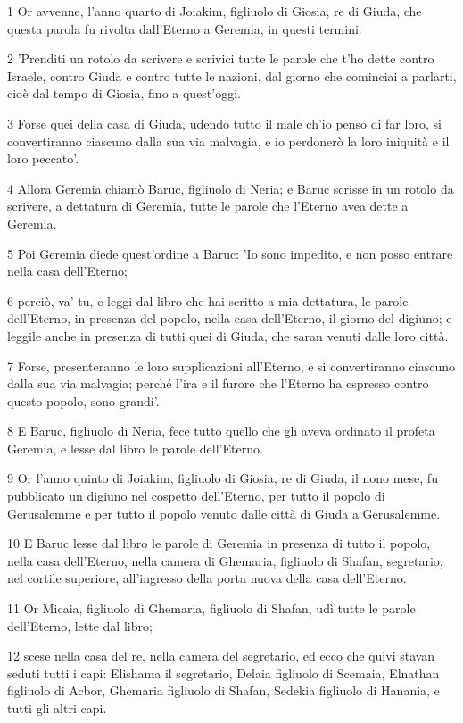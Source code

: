 \par 1 Or avvenne, l'anno quarto di Joiakim, figliuolo di Giosia, re di Giuda, che questa parola fu rivolta dall'Eterno a Geremia, in questi termini:
\par 2 'Prenditi un rotolo da scrivere e scrivici tutte le parole che t'ho dette contro Israele, contro Giuda e contro tutte le nazioni, dal giorno che cominciai a parlarti, cioè dal tempo di Giosia, fino a quest'oggi.
\par 3 Forse quei della casa di Giuda, udendo tutto il male ch'io penso di far loro, si convertiranno ciascuno dalla sua via malvagia, e io perdonerò la loro iniquità e il loro peccato'.
\par 4 Allora Geremia chiamò Baruc, figliuolo di Neria; e Baruc scrisse in un rotolo da scrivere, a dettatura di Geremia, tutte le parole che l'Eterno avea dette a Geremia.
\par 5 Poi Geremia diede quest'ordine a Baruc: 'Io sono impedito, e non posso entrare nella casa dell'Eterno;
\par 6 perciò, va' tu, e leggi dal libro che hai scritto a mia dettatura, le parole dell'Eterno, in presenza del popolo, nella casa dell'Eterno, il giorno del digiuno; e leggile anche in presenza di tutti quei di Giuda, che saran venuti dalle loro città.
\par 7 Forse, presenteranno le loro supplicazioni all'Eterno, e si convertiranno ciascuno dalla sua via malvagia; perché l'ira e il furore che l'Eterno ha espresso contro questo popolo, sono grandi'.
\par 8 E Baruc, figliuolo di Neria, fece tutto quello che gli aveva ordinato il profeta Geremia, e lesse dal libro le parole dell'Eterno.
\par 9 Or l'anno quinto di Joiakim, figliuolo di Giosia, re di Giuda, il nono mese, fu pubblicato un digiuno nel cospetto dell'Eterno, per tutto il popolo di Gerusalemme e per tutto il popolo venuto dalle città di Giuda a Gerusalemme.
\par 10 E Baruc lesse dal libro le parole di Geremia in presenza di tutto il popolo, nella casa dell'Eterno, nella camera di Ghemaria, figliuolo di Shafan, segretario, nel cortile superiore, all'ingresso della porta nuova della casa dell'Eterno.
\par 11 Or Micaia, figliuolo di Ghemaria, figliuolo di Shafan, udì tutte le parole dell'Eterno, lette dal libro;
\par 12 scese nella casa del re, nella camera del segretario, ed ecco che quivi stavan seduti tutti i capi: Elishama il segretario, Delaia figliuolo di Scemaia, Elnathan figliuolo di Acbor, Ghemaria figliuolo di Shafan, Sedekia figliuolo di Hanania, e tutti gli altri capi.
